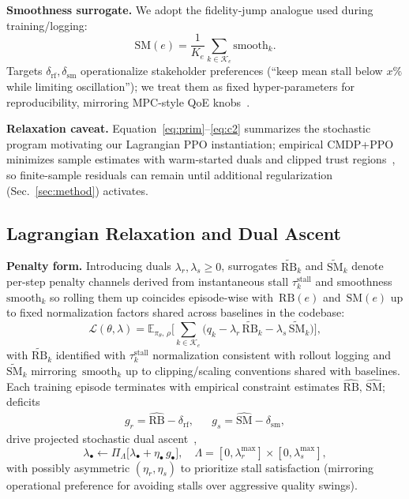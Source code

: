 \documentclass[preprint,12pt]{elsarticle}
\begin{document}
\textbf{Smoothness surrogate.}
We adopt the fidelity-jump analogue used during training/logging:
\begin{equation}
    \mathrm{SM}(e)=\frac{1}{K_{e}}\sum_{k\in\mathcal{K}_{e}} \mathrm{smooth}_k.
\end{equation}
Targets \(\delta_{\mathrm{rf}},\delta_{\mathrm{sm}}\) operationalize stakeholder preferences (``keep mean stall below \(x\%\) while limiting oscillation''); we treat them as fixed hyper-parameters for reproducibility, mirroring MPC-style QoE knobs~\cite{yin2015control}.

\textbf{Relaxation caveat.}
Equation~\eqref{eq:prim}--\eqref{eq:c2} summarizes the stochastic program motivating our Lagrangian PPO instantiation; empirical CMDP+PPO minimizes sample estimates with warm-started duals and clipped trust regions~\cite{achiam2017constrained,schulman2017proximal}, so finite-sample residuals can remain until additional regularization (Sec.~\ref{sec:method}) activates.

\subsection{Lagrangian Relaxation and Dual Ascent}

\textbf{Penalty form.}
Introducing duals \(\lambda_r,\lambda_s\ge 0\), surrogates \(\widetilde{\mathrm{RB}}_k\) and \(\widetilde{\mathrm{SM}}_k\) denote per-step penalty channels derived from instantaneous stall \(\tau^{\mathrm{stall}}_k\) and smoothness \(\mathrm{smooth}_k\) so rolling them up coincides episode-wise with~\(\mathrm{RB}(e)\) and~\(\mathrm{SM}(e)\) up to fixed normalization factors shared across baselines in the codebase:
\begin{equation}
\label{eq:L}
    \mathcal{L}(\theta,\lambda) =
    \mathbb{E}_{\pi_\theta,\,\rho}\Big[\sum_{k\in\mathcal{K}_{e}} \big( q_k - \lambda_r\, \widetilde{\mathrm{RB}}_k - \lambda_s\, \widetilde{\mathrm{SM}}_k \big)\Big],
\end{equation}
with \(\widetilde{\mathrm{RB}}_k\) identified with \(\tau^{\mathrm{stall}}_k\) normalization consistent with rollout logging and \(\widetilde{\mathrm{SM}}_k\) mirroring~\(\mathrm{smooth}_k\) up to clipping/scaling conventions shared with baselines.
Each training episode terminates with empirical constraint estimates \(\hat{\mathrm{RB}},\,\hat{\mathrm{SM}}\); deficits
\begin{align}
    g_r=\hat{\mathrm{RB}}-\delta_{\mathrm{rf}}, &&
    g_s=\hat{\mathrm{SM}}-\delta_{\mathrm{sm}},
\end{align}
drive projected stochastic dual ascent~\cite{paternain2019dual,altman1999constrained},
\begin{equation}
    \lambda_{\bullet}\leftarrow \Pi_{\Lambda}\big[\lambda_{\bullet}+\eta_{\bullet}\, g_{\bullet}\big],\quad \Lambda=[0,\lambda^{\max}_{r}]\times[0,\lambda^{\max}_{s}],
\end{equation}
with possibly asymmetric \((\eta_r,\eta_s)\) to prioritize stall satisfaction (mirroring operational preference for avoiding stalls over aggressive quality swings).
\end{document}
